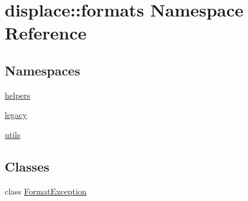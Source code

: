 \hypertarget{namespacedisplace_1_1formats}{}\section{displace\+::formats Namespace Reference}
\label{namespacedisplace_1_1formats}
\subsection*{Namespaces}
\begin{DoxyCompactItemize}
\item 
 \mbox{\hyperlink{namespacedisplace_1_1formats_1_1helpers}{helpers}}
\item 
 \mbox{\hyperlink{namespacedisplace_1_1formats_1_1legacy}{legacy}}
\item 
 \mbox{\hyperlink{namespacedisplace_1_1formats_1_1utils}{utils}}
\end{DoxyCompactItemize}
\subsection*{Classes}
\begin{DoxyCompactItemize}
\item 
class \mbox{\hyperlink{classdisplace_1_1formats_1_1_format_exception}{Format\+Exception}}
\end{DoxyCompactItemize}
